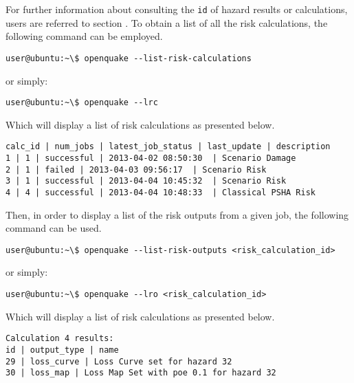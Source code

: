 For further information about consulting the \verb+id+ of hazard results or calculations, users are referred to section \label{sec:riskCalculators}. To obtain a list of all the risk calculations, the following command can be employed.

\begin{Verbatim}[frame=single, commandchars=\\\{\}, samepage=true]
user@ubuntu:~\$ openquake --list-risk-calculations
\end{Verbatim}

or simply:

\begin{Verbatim}[frame=single, commandchars=\\\{\}, samepage=true]
user@ubuntu:~\$ openquake --lrc
\end{Verbatim}

Which will display a list of risk calculations as presented below.

\begin{Verbatim}[frame=single, commandchars=\\\{\}, samepage=true]
calc_id | num_jobs | latest_job_status | last_update | description
1 | 1 | successful | 2013-04-02 08:50:30  | Scenario Damage
2 | 1 | failed | 2013-04-03 09:56:17  | Scenario Risk
3 | 1 | successful | 2013-04-04 10:45:32  | Scenario Risk
4 | 4 | successful | 2013-04-04 10:48:33  | Classical PSHA Risk
\end{Verbatim}

Then, in order to display a list of the risk outputs from a given job, the following command can be used.

\begin{Verbatim}[frame=single, commandchars=\\\{\}, samepage=true]
user@ubuntu:~\$ openquake --list-risk-outputs <risk_calculation_id>
\end{Verbatim}

or simply:

\begin{Verbatim}[frame=single, commandchars=\\\{\}, samepage=true]
user@ubuntu:~\$ openquake --lro <risk_calculation_id>
\end{Verbatim}

Which will display a list of risk calculations as presented below.

\begin{Verbatim}[frame=single, commandchars=\\\{\}, samepage=true]
Calculation 4 results:
id | output_type | name
29 | loss_curve | Loss Curve set for hazard 32
30 | loss_map | Loss Map Set with poe 0.1 for hazard 32
\end{Verbatim}

